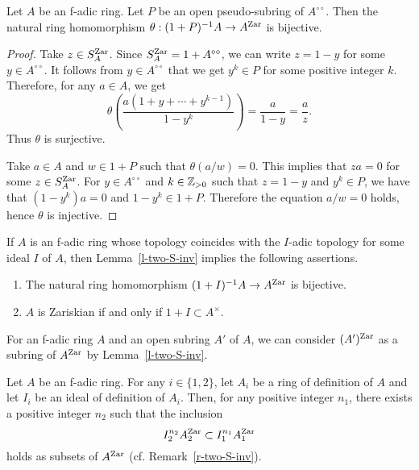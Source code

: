 \begin{lem}\label{l-two-S-inv}
Let $A$ be an f-adic ring. 
Let $P$ be an open pseudo-subring of $A^{\circ\circ}$. 
Then the natural ring homomorphism 
$\theta:(1+P)^{-1}A \to A^{{\operatorname{Zar}}}$ is bijective. 
\end{lem}

\begin{proof}
Take $z \in S_A^{{\operatorname{Zar}}}$. 
Since $S_A^{{\operatorname{Zar}}}=1+A^{\circ\circ}$, 
we can write $z=1-y$ for some $y \in A^{\circ\circ}$. 
It follows from $y \in A^{\circ\circ}$ that 
we get $y^k \in P$ for some positive integer $k$. 
Therefore, for any $a \in A$, we get 
$$\theta\left(\frac{a(1+y+\cdots+y^{k-1})}{1-y^k}\right)=\frac{a}{1-y}=\frac{a}{z}.$$
Thus $\theta$ is surjective. 

Take $a \in A$ and $w \in 1+P$ such that $\theta(a/w)=0$. 
This implies that $za=0$ for some $z \in S_A^{{\operatorname{Zar}}}$. 
For $y \in A^{\circ\circ}$ and $k \in \mathbb{Z}_{>0}$ such that 
$z=1-y$ and $y^k \in P$, 
we have that 
$(1-y^k)a=0$ and $1-y^k \in 1+P$. 
Therefore the equation $a/w=0$ holds, hence $\theta$ is injective. 
\end{proof}

\begin{rem}\label{r-FK-def}
If $A$ is an f-adic ring 
whose topology coincides with the $I$-adic topology 
for some ideal $I$ of $A$, 
then Lemma~\ref{l-two-S-inv} implies 
the following assertions. 
\begin{enumerate}
\item 
The natural ring homomorphism 
$(1+I)^{-1}A \to A^{{\operatorname{Zar}}}$ is bijective. 
\item 
$A$ is Zariskian if and only if $1+I \subset A^{\times}$. 
\end{enumerate}
\end{rem}


\begin{rem}\label{r-two-S-inv}
For an f-adic ring $A$ and an open subring $A'$ of $A$, 
we can consider $(A')^{{\operatorname{Zar}}}$ as a subring of $A^{{\operatorname{Zar}}}$ 
by Lemma~\ref{l-two-S-inv}. 
\end{rem}




\begin{lem}\label{l-top-indep}
Let $A$ be an f-adic ring. 
For any $i \in \{1, 2\}$, 
let $A_i$ be a ring of definition of $A$ and 
let $I_i$ be an ideal of definition of $A_i$. 
Then, for any positive integer $n_1$, 
there exists a positive integer $n_2$ such that 
the inclusion 
$$I_2^{n_2}A_2^{{\operatorname{Zar}}} \subset I_1^{n_1}A_1^{{\operatorname{Zar}}}$$
holds as subsets of $A^{{\operatorname{Zar}}}$ (cf. Remark~\ref{r-two-S-inv}). 
\end{lem}

